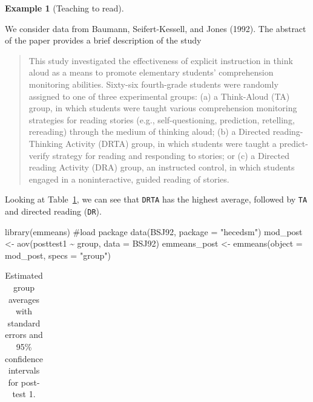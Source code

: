 \documentclass[
  11pt,
  letterpaper,
]{scrbook}
\newenvironment{Shaded}{\begin{snugshade}}{\end{snugshade}}
\newcommand{\AttributeTok}[1]{\textcolor[rgb]{0.40,0.45,0.13}{#1}}
\newcommand{\CommentTok}[1]{\textcolor[rgb]{0.37,0.37,0.37}{#1}}
\newcommand{\FunctionTok}[1]{\textcolor[rgb]{0.28,0.35,0.67}{#1}}
\newcommand{\NormalTok}[1]{\textcolor[rgb]{0.00,0.23,0.31}{#1}}
\newcommand{\OtherTok}[1]{\textcolor[rgb]{0.00,0.23,0.31}{#1}}
\newcommand{\SpecialCharTok}[1]{\textcolor[rgb]{0.37,0.37,0.37}{#1}}
\newcommand{\StringTok}[1]{\textcolor[rgb]{0.13,0.47,0.30}{#1}}
\theoremstyle{definition}
\theoremstyle{definition}
\newtheorem{example}{Example}[chapter]
\theoremstyle{remark}
\begin{document}
\begin{example}[Teaching to
read]\protect\hypertarget{exm-teachingtoread}{}\label{exm-teachingtoread}

We consider data from Baumann, Seifert-Kessell, and Jones (1992). The
abstract of the paper provides a brief description of the study

\begin{quote}
This study investigated the effectiveness of explicit instruction in
think aloud as a means to promote elementary students' comprehension
monitoring abilities. Sixty-six fourth-grade students were randomly
assigned to one of three experimental groups: (a) a Think-Aloud (TA)
group, in which students were taught various comprehension monitoring
strategies for reading stories (e.g., self-questioning, prediction,
retelling, rereading) through the medium of thinking aloud; (b) a
Directed reading-Thinking Activity (DRTA) group, in which students were
taught a predict-verify strategy for reading and responding to stories;
or (c) a Directed reading Activity (DRA) group, an instructed control,
in which students engaged in a noninteractive, guided reading of
stories.
\end{quote}

Looking at Table~\ref{tbl-print-pairwise-baumann}, we can see that
\texttt{DRTA} has the highest average, followed by \texttt{TA} and
directed reading (\texttt{DR}).

\begin{Shaded}
\begin{Highlighting}[]
\FunctionTok{library}\NormalTok{(emmeans) }\CommentTok{\#load package}
\FunctionTok{data}\NormalTok{(BSJ92, }\AttributeTok{package =} \StringTok{"hecedsm"}\NormalTok{)}
\NormalTok{mod\_post }\OtherTok{\textless{}{-}} \FunctionTok{aov}\NormalTok{(posttest1 }\SpecialCharTok{\textasciitilde{}}\NormalTok{ group, }\AttributeTok{data =}\NormalTok{ BSJ92)}
\NormalTok{emmeans\_post }\OtherTok{\textless{}{-}} \FunctionTok{emmeans}\NormalTok{(}\AttributeTok{object =}\NormalTok{ mod\_post, }
                        \AttributeTok{specs =} \StringTok{"group"}\NormalTok{)}
\end{Highlighting}
\end{Shaded}

\begin{longtable}[t]{lrrrrr}

\caption{\label{tbl-print-pairwise-baumann}Estimated group averages with
standard errors and 95\% confidence intervals for post-test 1.}


\end{longtable}
\end{example}
\end{document}
